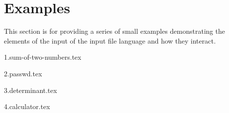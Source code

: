 
\chapter{Examples}
{
	This section is for providing a series of small examples
	demonstrating the elements of the input of the input file language
	and how they interact.
	
	{1.sum-of-two-numbers.tex}
	
	{2.passwd.tex}
	
	{3.determinant.tex}
	
	{4.calculator.tex}
}


